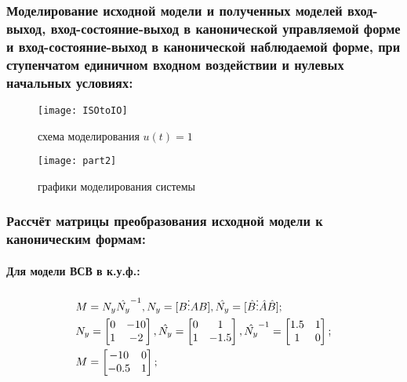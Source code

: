 \subsubsection{Моделирование исходной модели и полученных моделей вход-выход, вход-состояние-выход в канонической управляемой форме и вход-состояние-выход в канонической наблюдаемой форме, при ступенчатом единичном входном воздействии и нулевых начальных условиях:}

\begin{figure}[H]
	\begin{center}
		\texttt{[image: ISOtoIO]}
		\caption{схема моделирования $u(t) = 1$} 
		\label{pic:pic_3} %
	\end{center}
\end{figure}

\begin{figure}[H]
	\begin{center}
		\texttt{[image: part2]}
		\caption{графики моделирования системы} 
		\label{pic:pic_4} %
	\end{center}
\end{figure}

\subsubsection{Рассчёт матрицы преобразования исходной модели к каноническим формам:}

\paragraph{Для модели ВСВ в к.у.ф.:}

\begin{equation}
	\begin{split}	
		&M=N_y\Hat{N_y}^{-1}, N_y=[B\vdots AB], \Hat{N_y}=[\Hat{B}\vdots \Hat{A}\Hat{B}];\\
		&N_y=\begin{bmatrix}
			0 & -10\\
			1 & -2\\
		\end{bmatrix}, \Hat{N_y}=\begin{bmatrix}
					   		0 & 1\\
					   		1 & -1.5\\
					   \end{bmatrix}, \Hat{N_y}^{-1}=\begin{bmatrix}
					   						1.5 & 1\\
					   						1 & 0\\
					   				  \end{bmatrix};\\
		&M=\begin{bmatrix}
			-10 & 0\\
			-0.5 & 1\\
		\end{bmatrix};\\
	\end{split}
\end{equation}

